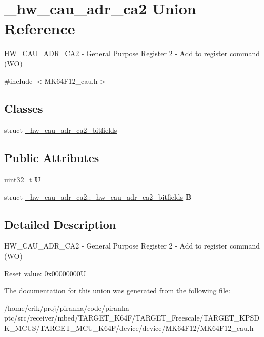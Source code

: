 \hypertarget{union__hw__cau__adr__ca2}{}\section{\+\_\+hw\+\_\+cau\+\_\+adr\+\_\+ca2 Union Reference}
\label{union__hw__cau__adr__ca2}


H\+W\+\_\+\+C\+A\+U\+\_\+\+A\+D\+R\+\_\+\+C\+A2 -\/ General Purpose Register 2 -\/ Add to register command (WO)  




{\ttfamily \#include $<$M\+K64\+F12\+\_\+cau.\+h$>$}

\subsection*{Classes}
\begin{DoxyCompactItemize}
\item 
struct \hyperlink{struct__hw__cau__adr__ca2_1_1__hw__cau__adr__ca2__bitfields}{\+\_\+hw\+\_\+cau\+\_\+adr\+\_\+ca2\+\_\+bitfields}
\end{DoxyCompactItemize}
\subsection*{Public Attributes}
\begin{DoxyCompactItemize}
\item 
uint32\+\_\+t {\bfseries U}\hypertarget{union__hw__cau__adr__ca2_aa6913a7bc639cb9b05cf9c6c3b7fedf9}{}\label{union__hw__cau__adr__ca2_aa6913a7bc639cb9b05cf9c6c3b7fedf9}

\item 
struct \hyperlink{struct__hw__cau__adr__ca2_1_1__hw__cau__adr__ca2__bitfields}{\+\_\+hw\+\_\+cau\+\_\+adr\+\_\+ca2\+::\+\_\+hw\+\_\+cau\+\_\+adr\+\_\+ca2\+\_\+bitfields} {\bfseries B}\hypertarget{union__hw__cau__adr__ca2_ac78a7ac8da8c16b80e16a9cff1523308}{}\label{union__hw__cau__adr__ca2_ac78a7ac8da8c16b80e16a9cff1523308}

\end{DoxyCompactItemize}


\subsection{Detailed Description}
H\+W\+\_\+\+C\+A\+U\+\_\+\+A\+D\+R\+\_\+\+C\+A2 -\/ General Purpose Register 2 -\/ Add to register command (WO) 

Reset value\+: 0x00000000U 

The documentation for this union was generated from the following file\+:\begin{DoxyCompactItemize}
\item 
/home/erik/proj/piranha/code/piranha-\/ptc/src/receiver/mbed/\+T\+A\+R\+G\+E\+T\+\_\+\+K64\+F/\+T\+A\+R\+G\+E\+T\+\_\+\+Freescale/\+T\+A\+R\+G\+E\+T\+\_\+\+K\+P\+S\+D\+K\+\_\+\+M\+C\+U\+S/\+T\+A\+R\+G\+E\+T\+\_\+\+M\+C\+U\+\_\+\+K64\+F/device/device/\+M\+K64\+F12/M\+K64\+F12\+\_\+cau.\+h\end{DoxyCompactItemize}
